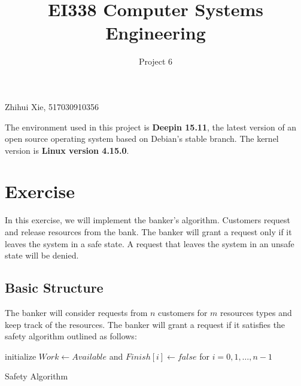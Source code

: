 \documentclass{article}
\title{EI338 Computer Systems Engineering}
\author{Project 6}
\begin{document}
\maketitle

\begin{center}
    Zhihui Xie, 517030910356
\end{center}

The environment used in this project is \textbf{Deepin 15.11}, the latest version of an open source operating system based on Debian's stable branch. The kernel version is \textbf{Linux version 4.15.0}.

\section*{Exercise}
In this exercise, we will implement the banker's algorithm. Customers request and release resources from the bank. The banker will grant a request only if it leaves the system in a safe state. A request that leaves the system in an unsafe state will be denied.

\subsection*{Basic Structure}
The banker will consider requests from $n$ customers for $m$ resources types and keep track of the resources. The banker will grant a request if it satisfies the safety algorithm outlined as follows:

\begin{center}
    \begin{minipage}{16cm}
        \begin{algorithm}[H]
            \SetAlgoLined
            initialize $Work \leftarrow Available$ and $Finish[i] \leftarrow false$ for $i=0,1, \ldots, n-1$\;

             {
            }
                
            \caption{Safety Algorithm}
            \label{Safety Algorithm}
        \end{algorithm} 
    \end{minipage}
\end{center}
\end{document}
